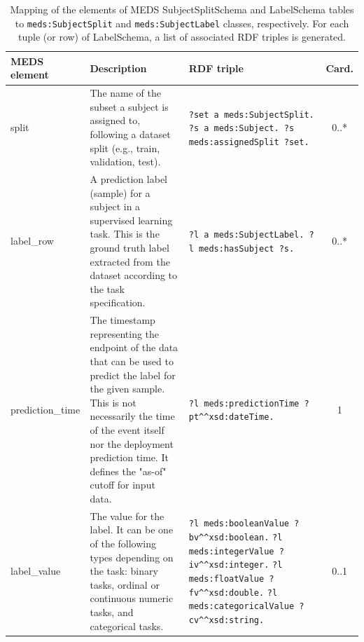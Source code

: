 \begin{table}[htbp]
	\centering
	\caption{Mapping of the elements of MEDS SubjectSplitSchema and LabelSchema tables to \texttt{meds:SubjectSplit} and \texttt{meds:SubjectLabel} classes, respectively. For each tuple (or row) of LabelSchema, a list of associated RDF triples is generated.
	}
	\label{tab:paper3_labels}
\begin{tabularx}{\textwidth}{l >{\raggedright\arraybackslash}X >{\raggedright\arraybackslash}X c}		\toprule
		\textbf{MEDS element} & \textbf{Description} & \textbf{RDF triple} & \textbf{Card.} \\
		\midrule
		split & The name of the subset a subject is assigned to, following a dataset split (e.g., train, validation, test). & \texttt{?set a meds:SubjectSplit. \break ?s a meds:Subject. \break ?s meds:assignedSplit ?set.} & 0..* \\
		
		label\_row & A prediction label (sample) for a subject in a supervised learning task. This is the ground truth label extracted from the dataset according to the task specification. & \texttt{?l a meds:SubjectLabel. \break ?l meds:hasSubject ?s.} & 0..* \\
		
		prediction\_time & The timestamp representing the endpoint of the data that can be used to predict the label for the given sample. This is not necessarily the time of the event itself nor the deployment prediction time. It defines the "as-of" cutoff for input data. & \texttt{?l meds:predictionTime ?pt}\texttt{\string^\string^}\texttt{xsd:dateTime.} & 1 \\
		
		label\_value & The value for the label. It can be one of the following types depending on the task: binary tasks, ordinal or continuous numeric tasks, and categorical tasks. 
		&
		\texttt{?l meds:booleanValue ?bv}\texttt{\string^\string^}\texttt{xsd:boolean.} \break
		\texttt{?l meds:integerValue ?iv}\texttt{\string^\string^}\texttt{xsd:integer.} \break
		\texttt{?l meds:floatValue ?fv}\texttt{\string^\string^}\texttt{xsd:double.} \break
		\texttt{?l meds:\allowbreak categoricalValue ?cv}\texttt{\string^\string^}\texttt{xsd:string.} & 0..1 \\
		\bottomrule
\end{tabularx}
\end{table}



